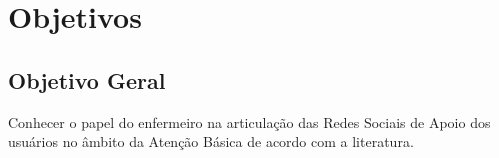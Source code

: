 \section{Objetivos}
\label{sec:objetivos}

\subsection{Objetivo Geral}
\label{sec:objetivo-geral}

Conhecer o papel do enfermeiro na articulação das Redes Sociais de Apoio dos usuários no âmbito da Atenção Básica de acordo com a literatura.


